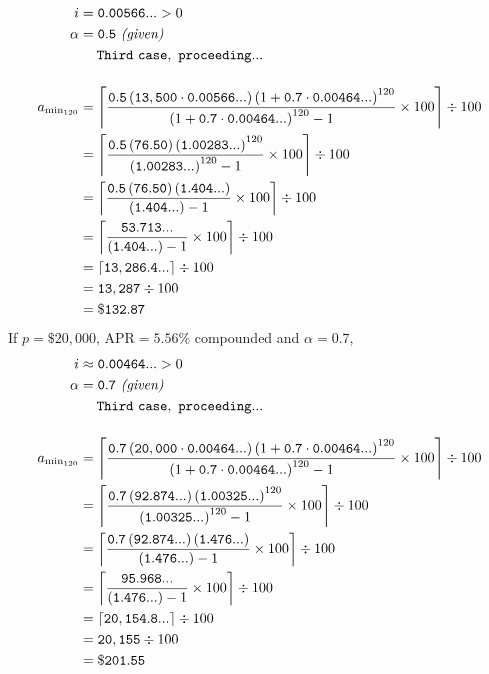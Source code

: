 \documentclass[12pt,letterpaper,oneside]{article}
\theoremstyle{remark} %
\begin{document}
	\begin{align*}
	i&=\mathtt{0.00566...}>0\\
	\alpha&=\mathtt{0.5}\ \textit{(given)}\\
	&\quad\;\mathtt{Third\ case,\ proceeding...}\\[12pt]
	a_{\rm{min_{120}}}&=\left\lceil{\frac{\mathtt{0.5}\left(\mathtt{13,500}\cdot\mathtt{0.00566...}\right)\base^{120}}{\base^{120}-1}\times 100}\right\rceil\div 100\\
	&=\left\lceil{\frac{\mathtt{0.5}\left(\mathtt{76.50}\right)\left(\mathtt{1.00283...}\right)^{120}}{\left(\mathtt{1.00283...}\right)^{120}-1}\times 100}\right\rceil\div 100\\
	&=\left\lceil{\frac{\mathtt{0.5}\left(\mathtt{76.50}\right)\left(\mathtt{1.404...}\right)}{\left(\mathtt{1.404...}\right)-1}\times 100}\right\rceil\div 100\\
	&=\left\lceil{\frac{\mathtt{53.713...}}{\left(\mathtt{1.404...}\right)-1}\times 100}\right\rceil\div 100\\
	&=\left\lceil{\mathtt{13,286.4...}}\right\rceil\div 100\\
	&=\mathtt{13,287}\div 100\\
	&=\mathtt{\$132.87}
	\end{align*}
	\renewcommand{\base}{\left(1+\mathtt{0.7}\cdot\mathtt{0.00464...}\right)}
	If $p=\$20,000$, $\mbox{APR}=5.56\%$ compounded and $\alpha=0.7$,
	\begin{align*}
	i&\approx\mathtt{0.00464...}>0\\
	\alpha&=\mathtt{0.7}\ \textit{(given)}\\
	&\quad\;\mathtt{Third\ case,\ proceeding...}\\[12pt]
	a_{\rm{min_{120}}}&=\left\lceil{\frac{\mathtt{0.7}\left(\mathtt{20,000}\cdot\mathtt{0.00464...}\right)\base^{120}}{\base^{120}-1}\times 100}\right\rceil\div 100\\
	&=\left\lceil{\frac{\mathtt{0.7}\left(\mathtt{92.874...}\right)\left(\mathtt{1.00325...}\right)^{120}}{\left(\mathtt{1.00325...}\right)^{120}-1}\times 100}\right\rceil\div 100\\
	&=\left\lceil{\frac{\mathtt{0.7}\left(\mathtt{92.874...}\right)\left(\mathtt{1.476...}\right)}{\left(\mathtt{1.476...}\right)-1}\times 100}\right\rceil\div 100\\
	&=\left\lceil{\frac{\mathtt{95.968...}}{\left(\mathtt{1.476...}\right)-1}\times 100}\right\rceil\div 100\\
	&=\left\lceil{\mathtt{20,154.8...}}\right\rceil\div 100\\
	&=\mathtt{20,155}\div 100\\
	&=\mathtt{\$201.55}
	\end{align*}
\end{document}
